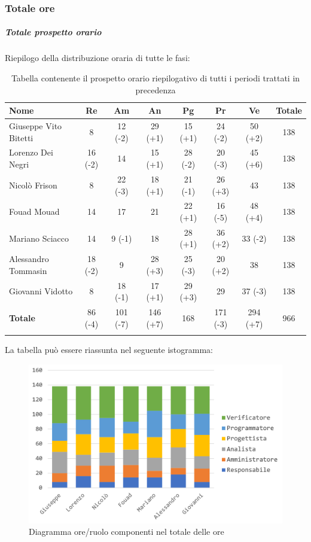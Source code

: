 		\subsubsection{Totale ore}
		\subparagraph{Totale prospetto orario }
		Riepilogo della distribuzione oraria di tutte le fasi:
		\begin{longtable}{|l|c|c|c|c|c|c|c|}
			\hline
			\rowcolor{lighter-grayer}
			\textbf{Nome} & \textbf{Re} & \textbf{Am} & \textbf{An} & \textbf{Pg}  & \textbf{Pr}   & \textbf{Ve} & \textbf{Totale} \\
			\hline
			\endfirsthead
			
			\hline
			Giuseppe Vito Bitetti 		& 8 & 12 (-2) & 29 (+1) & 15 (+1) & 24 (-2) & 50 (+2) & 138\\
			\hline
			\hline
			Lorenzo Dei Negri			& 16 (-2) & 14 & 15 (+1) & 28 (-2) & 20 (-3) & 45 (+6) & 138\\
			\hline
			\hline
			Nicolò Frison				    & 8 & 22 (-3) & 18 (+1) & 21 (-1) & 26 (+3) & 43 & 138\\
			\hline
			\hline
			Fouad Mouad 				 & 14 & 17 & 21 & 22 (+1) & 16 (-5) & 48 (+4) & 138\\
			\hline
			\hline
			Mariano Sciacco 			& 14 & 9 (-1) & 18 & 28 (+1) & 36 (+2) & 33 (-2) & 138\\
			\hline
			\hline
			Alessandro Tommasin    & 18 (-2) & 9 & 28 (+3) & 25 (-3) & 20 (+2) & 38 & 138\\
			\hline
			\hline
			Giovanni Vidotto 			 & 8 & 18 (-1) & 17 (+1) & 29 (+3) & 29 & 37 (-3) & 138\\
			\hline 
			\textbf{Totale}				 & 86 (-4) & 101 (-7) & 146 (+7) & 168 & 171 (-3) & 294 (+7) & 966\\
			\hline
			\caption{Tabella contenente il prospetto orario riepilogativo di tutti i periodi trattati in precedenza}
		\end{longtable}
		
		La tabella può essere riassunta nel seguente istogramma:
		\begin{figure}[H]
			\centering
			\includegraphics[width=0.8\linewidth]{./images/consuntivo/totOre1.png}
			\caption{Diagramma ore/ruolo componenti nel totale delle ore}
			\label{fig:diagramma suddivione ruoli totale ore}
		\end{figure}
		\pagebreak
		

